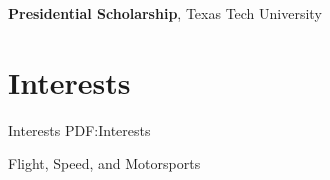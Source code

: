 \documentclass[a4paper,10pt,oneside]{article}
\begin{document}
\begin{body}
{\textbf{Presidential Scholarship}},
Texas Tech University
\hfill
{}
\begin{detail}

\end{detail}






\section
{Interests}
{Interests}
{PDF:Interests}

Flight, Speed, and Motorsports

\end{body}
\end{document}
